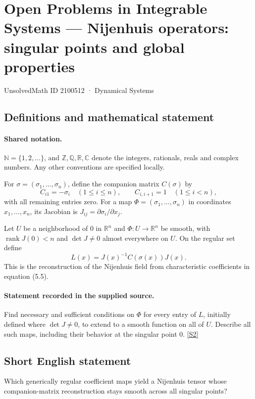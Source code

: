\documentclass[11pt]{article}
\newcommand{\sref}[2]{\hyperlink{source:#1:#2}{[S#2]}}
\begin{document}
\setcounter{section}{2100511}
\section{Open Problems in Integrable Systems — Nijenhuis operators: singular points and global properties}\label{2100512}
{\small\sffamily UnsolvedMath ID 2100512 · Dynamical Systems}
\subsection{Definitions and mathematical statement}

\paragraph{Shared notation.}$\mathbb N=\{1,2,\ldots\}$, and $\mathbb Z,\mathbb Q,\mathbb R,\mathbb C$ denote the integers, rationals, reals and complex numbers. Any other conventions are specified locally.


For $\sigma=(\sigma_1,\ldots,\sigma_n)$, define the companion matrix $C(\sigma)$ by
\[ C_{i1}=-\sigma_i\quad(1\leq i\leq n),\qquad C_{i,i+1}=1\quad(1\leq i<n), \]
with all remaining entries zero. For a map $\Phi=(\sigma_1,\ldots,\sigma_n)$ in coordinates $x_1,\ldots,x_n$, its Jacobian is $J_{ij}=\partial\sigma_i/\partial x_j$.\par Let $U$ be a neighborhood of $0$ in $\mathbb R^n$ and $\Phi:U\to\mathbb R^n$ be smooth, with $\operatorname{rank}J(0)<n$ and $\det J\neq0$ almost everywhere on $U$. On the regular set define
\[ L(x)=J(x)^{-1}C(\sigma(x))J(x). \]
This is the reconstruction of the Nijenhuis field from characteristic coefficients in equation (5.5).
\paragraph{Statement recorded in the supplied source.}
Find necessary and sufficient conditions on $\Phi$ for every entry of $L$, initially defined where $\det J\neq0$, to extend to a smooth function on all of $U$. Describe all such maps, including their behavior at the singular point $0$. \sref{2100512}{2}
\subsection{Short English statement}
Which generically regular coefficient maps yield a Nijenhuis tensor whose companion-matrix reconstruction stays smooth across all singular points?
\end{document}
